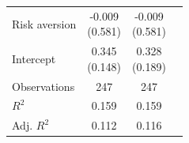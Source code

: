 \begin{threeparttable}
\begin{tabular}{lccc}
Risk aversion & \makecell{-0.009 \\ (0.581) } & \makecell{-0.009 \\ (0.581) } \\
Intercept & \makecell{0.345 \\ (0.148) } & \makecell{0.328 \\ (0.189) } \\
\midrule
\addlinespace
Observations & 247 & 247 \\
$R^2$ & 0.159 & 0.159 \\
Adj. $R^2$ & 0.112 & 0.116 \\
\bottomrule
\end{tabular}
\footnotesize  
\end{threeparttable}